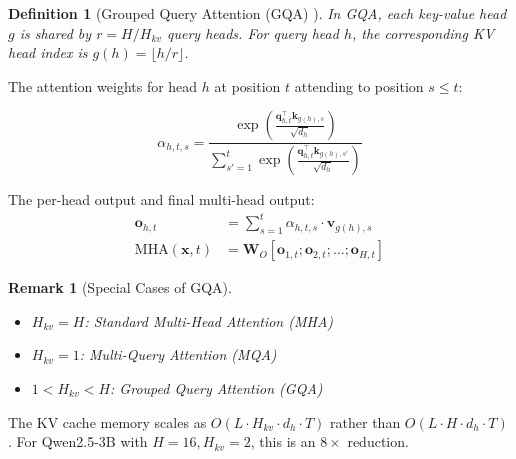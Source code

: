 \documentclass[12pt,a4paper]{article}
\newtheorem{definition}{Definition}[section]
\newtheorem{remark}{Remark}[section]
\begin{document}
\begin{definition}[Grouped Query Attention (GQA) \citep{ainslie2023gqa}]
\label{def:gqa}
In GQA, each key-value head $g$ is shared by $r = H / H_{kv}$ query heads. For query head $h$, the corresponding KV head index is $g(h) = \lfloor h / r \rfloor$.
\end{definition}

The attention weights for head $h$ at position $t$ attending to position $s \leq t$:

\begin{eqbox}
\begin{equation}
\alpha_{h,t,s} = \frac{\exp\left(\frac{\bm{q}_{h,t}^\top \bm{k}_{g(h),s}}{\sqrt{d_h}}\right)}{\displaystyle\sum_{s'=1}^{t} \exp\left(\frac{\bm{q}_{h,t}^\top \bm{k}_{g(h),s'}}{\sqrt{d_h}}\right)}
\label{eq:gqa_score}
\end{equation}
\end{eqbox}

The per-head output and final multi-head output:
\begin{align}
\bm{o}_{h,t} &= \sum_{s=1}^{t} \alpha_{h,t,s} \cdot \bm{v}_{g(h),s} \label{eq:head_output} \\
\text{MHA}(\bm{x}, t) &= \bm{W}_O \left[\bm{o}_{1,t}; \bm{o}_{2,t}; \ldots; \bm{o}_{H,t}\right] \label{eq:mha_output}
\end{align}

\begin{remark}[Special Cases of GQA]
\begin{itemize}[nosep]
    \item $H_{kv} = H$: Standard Multi-Head Attention (MHA) \citep{vaswani2017attention}
    \item $H_{kv} = 1$: Multi-Query Attention (MQA) \citep{shazeer2019mqa}
    \item $1 < H_{kv} < H$: Grouped Query Attention (GQA) \citep{ainslie2023gqa}
\end{itemize}
\end{remark}

The KV cache memory scales as $O(L \cdot H_{kv} \cdot d_h \cdot T)$ rather than $O(L \cdot H \cdot d_h \cdot T)$. For Qwen2.5-3B with $H=16, H_{kv}=2$, this is an $8\times$ reduction.
\end{document}
